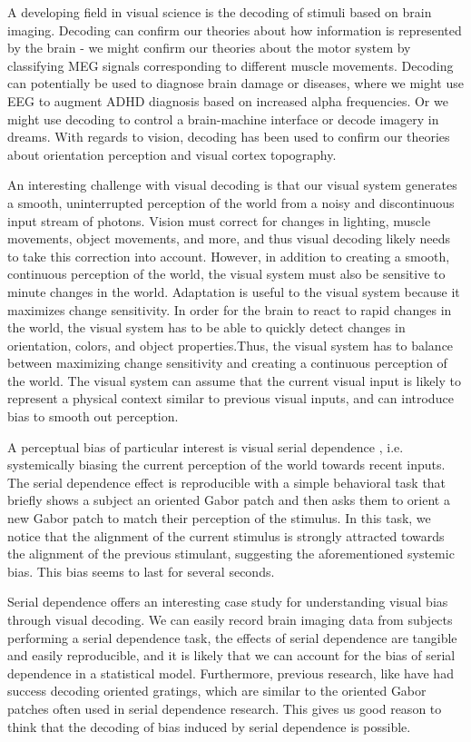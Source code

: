 \documentclass[../main.tex]{subfiles}
\begin{document}
A developing field in visual science is the decoding of stimuli based on brain imaging. Decoding can confirm our theories about how information is represented by the brain - we might confirm our theories about the motor system by classifying MEG signals corresponding to different muscle movements. Decoding can potentially be used to diagnose brain damage or diseases, where we might use EEG to augment ADHD diagnosis based on increased alpha frequencies. Or we might use decoding to control a brain-machine interface or decode imagery in dreams. With regards to vision, decoding has been used to confirm our theories about orientation perception and visual cortex topography. 

An interesting challenge with visual decoding is that our visual system generates a smooth, uninterrupted perception of the world from a noisy and discontinuous input stream of photons. Vision must correct for changes in lighting, muscle movements, object movements, and more, and thus visual decoding likely needs to take this correction into account. However, in addition to creating a smooth, continuous perception of the world, the visual system must also be sensitive to minute changes in the world. Adaptation is useful to the visual system because it maximizes change sensitivity. In order for the brain to react to rapid changes in the world, the visual system has to be able to quickly detect changes in orientation, colors, and object properties.Thus, the visual system has to balance between maximizing change sensitivity and creating a continuous perception of the world. The visual system can assume that the current visual input is likely to represent a physical context similar to previous visual inputs, and can introduce bias to smooth out perception. 

A perceptual bias of particular interest is visual serial dependence \citep{fischer_whitney_2014}, i.e. systemically biasing the current perception of the world towards recent inputs. The serial dependence effect is reproducible with a simple behavioral task that briefly shows a subject an oriented Gabor patch and then asks them to orient a new Gabor patch to match their perception of the stimulus. In this task, we notice that the alignment of the current stimulus is strongly attracted towards the alignment of the previous stimulant, suggesting the aforementioned systemic bias. This bias seems to last for several seconds. 

Serial dependence offers an interesting case study for understanding visual bias through visual decoding. We can easily record brain imaging data from subjects performing a serial dependence task, the effects of serial dependence are tangible and easily reproducible, and it is likely that we can account for the bias of serial dependence in a statistical model. Furthermore, previous research, like \cite{GARCIA2013515} have had success decoding oriented gratings, which are similar to the oriented Gabor patches often used in serial dependence research. This gives us good reason to think that the decoding of bias induced by serial dependence is possible.
\end{document}
